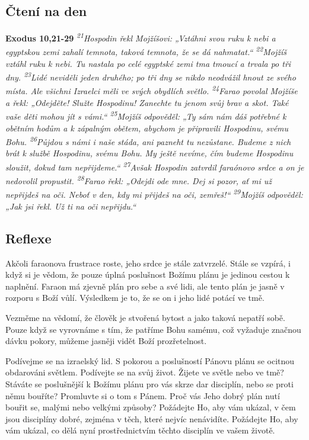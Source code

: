 \documentclass[11pt]{article}
\begin{document}
\subsection*{Čtení na den}
\textbf{Exodus 10,21-29}
\newline
\textit{
\textsuperscript{21}Hospodin řekl Mojžíšovi: „Vztáhni svou ruku k nebi a egyptskou zemi zahalí temnota, taková temnota, že se dá nahmatat.“
\textsuperscript{22}Mojžíš vztáhl ruku k nebi. Tu nastala po celé egyptské zemi tma tmoucí a trvala po tři dny.
\textsuperscript{23}Lidé neviděli jeden druhého; po tři dny se nikdo neodvážil hnout ze svého místa. Ale všichni Izraelci měli ve svých obydlích světlo.
\textsuperscript{24}Farao povolal Mojžíše a řekl: „Odejděte! Služte Hospodinu! Zanechte tu jenom svůj brav a skot. Také vaše děti mohou jít s vámi.“
\textsuperscript{25}Mojžíš odpověděl: „Ty sám nám dáš potřebné k obětním hodům a k zápalným obětem, abychom je připravili Hospodinu, svému Bohu.
\textsuperscript{26}Půjdou s námi i naše stáda, ani pazneht tu nezůstane. Budeme z nich brát k službě Hospodinu, svému Bohu. My ještě nevíme, čím budeme Hospodinu sloužit, dokud tam nepřijdeme.“
\textsuperscript{27}Avšak Hospodin zatvrdil faraónovo srdce a on je nedovolil propustit.
\textsuperscript{28}Farao řekl: „Odejdi ode mne. Dej si pozor, ať mi už nepřijdeš na oči. Neboť v den, kdy mi přijdeš na oči, zemřeš!“
\textsuperscript{29}Mojžíš odpověděl: „Jak jsi řekl. Už ti na oči nepřijdu.“
}

\subsection*{Reflexe}
Akčoli faraonova frustrace roste, jeho srdce je stále zatvrzelé. Stále se vzpírá, i když si je vědom, že
pouze úplná poslušnost Božímu plánu je jedinou cestou k naplnění. Faraon má zjevně plán pro sebe a své
lidi, ale tento plán je jasně v rozporu s Boží vůlí. Výsledkem je to, že se on i jeho lidé potácí ve tmě.

Vezměme na vědomí, že člověk je stvořená bytost a jako taková nepatří sobě. Pouze když se vyrovnáme
s tím, že patříme Bohu samému, což vyžaduje značnou dávku pokory, můžeme jasněji vidět Boží
prozřetelnost.

Podívejme se na izraelský lid. S pokorou a poslušností Pánovu plánu se ocitnou obdarováni světlem.
Podívejte se na svůj život. Žijete ve světle nebo ve tmě? Stáváte se poslušnější k Božímu plánu pro vás
skrze dar disciplín, nebo se proti němu bouříte? Promluvte si o tom s Pánem. Proč vás Jeho dobrý plán
nutí bouřit se, malými nebo velkými způsoby? Požádejte Ho, aby vám ukázal, v čem jsou disciplíny
dobré, zejména v těch, které nejvíc nenávidíte. Požádejte Ho, aby vám ukázal, co dělá nyní
prostřednictvím těchto disciplín ve vašem životě.
\end{document}
